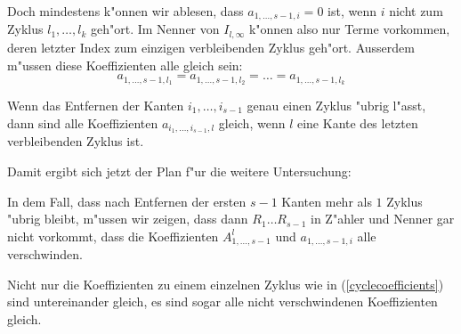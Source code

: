 Doch mindestens k"onnen wir ablesen, dass $a_{1,\dots,s-1,i}=0$ ist,
wenn $i$ nicht zum Zyklus $l_1,\dots,l_k$ geh"ort. Im Nenner von
$I_{l,\infty}$ k"onnen also nur Terme vorkommen, deren letzter Index
zum einzigen verbleibenden Zyklus geh"ort.
Ausserdem m"ussen diese Koeffizienten alle gleich sein:
\begin{equation}
a_{1,\dots,s-1,l_1}=a_{1,\dots,s-1,l_2}=\dots= a_{1,\dots,s-1,l_k}
\label{cyclecoefficients}
\end{equation}
\begin{hilfssatz}
\label{gleichekoef-n-1}
Wenn das Entfernen der Kanten $i_1,\dots,i_{s-1}$ genau einen
Zyklus "ubrig l"asst, dann sind alle Koeffizienten
$a_{i_1,\dots,i_{s-1},l}$ gleich, wenn $l$ eine Kante des letzten
verbleibenden Zyklus ist.
\end{hilfssatz}
Damit ergibt sich jetzt der Plan f"ur die weitere Untersuchung:
\begin{compactenum}
\item In dem Fall, dass nach Entfernen der ersten $s-1$ Kanten mehr als $1$
Zyklus "ubrig bleibt, m"ussen wir zeigen, dass dann $R_1\dots R_{s-1}$
in Z"ahler und Nenner gar nicht vorkommt, dass die Koeffizienten
$A_{1,\dots,s-1}^l$ und $a_{1,\dots,s-1,i}$ alle verschwinden.
\item Nicht nur die Koeffizienten zu einem einzelnen Zyklus
wie in (\ref{cyclecoefficients}) sind untereinander gleich, es sind
sogar alle nicht verschwindenen Koeffizienten gleich.
\end{compactenum}

